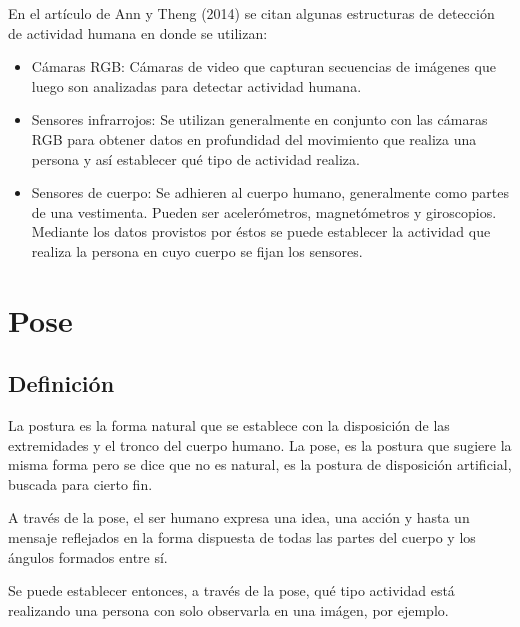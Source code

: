 \documentclass[a4paper,12pt,oneside,spanish]{book}
\begin{document}
En el artículo de Ann y Theng (2014) \cite{activity1} se citan algunas estructuras de detección de actividad humana en donde se utilizan:
\begin{itemize}
	\setlength\itemsep{-1.2em}
	\item Cámaras RGB: Cámaras de video que capturan secuencias de imágenes que luego son analizadas para detectar actividad humana.\\	
	\item Sensores infrarrojos: Se utilizan generalmente en conjunto con las cámaras RGB para obtener datos en profundidad del movimiento que realiza una persona y así establecer qué tipo de actividad realiza.\\	
	\item Sensores de cuerpo: Se adhieren al cuerpo humano, generalmente como partes de una vestimenta. Pueden ser acelerómetros, magnetómetros y giroscopios. Mediante los datos provistos por éstos se puede establecer la actividad que realiza la persona en cuyo cuerpo se fijan los sensores.\\
\end{itemize}



\newpage
\chapter{Pose}
\section{Definición} \label{posturaypose}

La postura es la forma natural que se establece con la disposición de las extremidades y el tronco del cuerpo humano. La pose, es la postura que sugiere la misma forma pero se dice que no es natural, es la postura de disposición artificial, buscada para cierto fin. \par

A través de la pose, el ser humano expresa una idea, una acción y hasta un mensaje reflejados en la forma dispuesta de todas las partes del cuerpo y los ángulos formados entre sí. \par

Se puede establecer entonces, a través de la pose, qué tipo actividad está realizando una persona con solo observarla en una imágen, por ejemplo. \par
\end{document}

